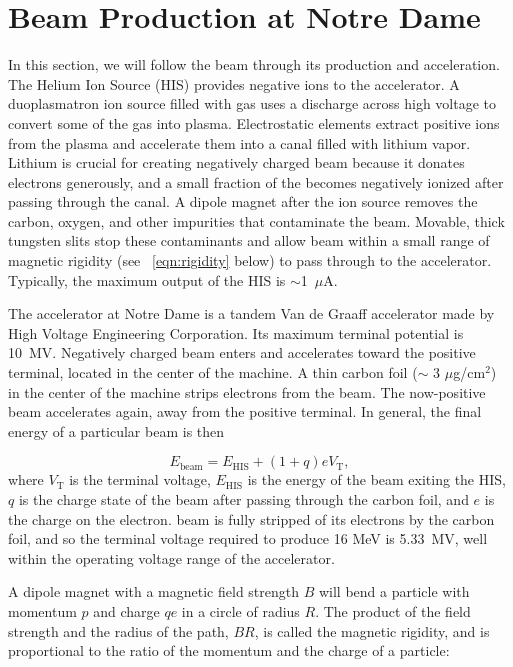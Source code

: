 \section{Beam Production at Notre Dame}
\label{sec:beamProduction}

In this section, we will follow the beam through its production and acceleration.  The Helium Ion Source (HIS) provides negative  ions to the accelerator.  A duoplasmatron ion source filled with  gas uses a discharge across high voltage to convert some of the gas into plasma.  Electrostatic elements extract positive  ions from the plasma and accelerate them into a canal filled with lithium vapor.  Lithium is crucial for creating negatively charged beam because it donates electrons generously, and a small fraction of the  becomes negatively ionized after passing through the canal.  A dipole magnet after the ion source removes the carbon, oxygen, and other impurities that contaminate the  beam.  Movable, thick tungsten slits stop these contaminants and allow beam within a small range of magnetic rigidity (see {\eqn}~\ref{eqn:rigidity} below) to pass through to the accelerator.  Typically, the maximum output of the HIS is $\sim$1~$\mu$A.

The accelerator at Notre Dame is a tandem Van de Graaff accelerator made by High Voltage Engineering Corporation.  Its maximum terminal potential is 10~MV.  Negatively charged beam enters and accelerates toward the positive terminal, located in the center of the machine. A thin carbon foil ($\sim$ 3 $\mu$g/cm$^2$) in the center of the machine strips electrons from the beam.  The now-positive beam accelerates again, away from the positive terminal. In general, the final energy of a particular beam is then

\begin{equation}
E_{\text{beam}} = E_{\text{HIS}} + (1+q)eV_{\text{T}},
\label{eqn:beamEnergy}
\end{equation}
where $V_{\text{T}}$ is the terminal voltage, $E_{\text{HIS}}$ is the energy of the beam exiting the HIS, $q$ is the charge state of the beam after passing through the carbon foil, and $e$ is the charge on the electron.   beam is fully stripped of its electrons by the carbon foil, and so the terminal voltage required to produce 16 MeV  is 5.33~MV, well within the operating voltage range of the accelerator.    

A dipole magnet with a magnetic field strength $B$ will bend a particle with momentum $p$ and charge $qe$ in a circle of radius $R$.  The product of the field strength and the radius of the path, $BR$, is called the magnetic rigidity, and is proportional to the ratio of the momentum and the charge of a particle:

